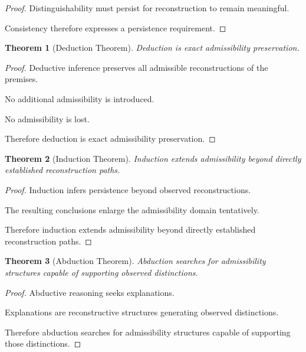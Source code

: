 \documentclass[12pt,oneside]{article}
\newtheorem{theorem}{Theorem}[section] \newtheorem{lemma}[theorem]{Lemma} \newtheorem{proposition}[theorem]{Proposition} \newtheorem{corollary}[theorem]{Corollary}
\theoremstyle{definition}
\begin{document}
\begin{proof}

Distinguishability must persist for reconstruction to remain meaningful.

Consistency therefore expresses a persistence requirement.

\end{proof}

\begin{theorem}[Deduction Theorem]

Deduction is exact admissibility preservation.

\end{theorem}

\begin{proof}

Deductive inference preserves all admissible reconstructions of the premises.

No additional admissibility is introduced.

No admissibility is lost.

Therefore deduction is exact admissibility preservation.

\end{proof}

\begin{theorem}[Induction Theorem]

Induction extends admissibility beyond directly established reconstruction paths.

\end{theorem}

\begin{proof}

Induction infers persistence beyond observed reconstructions.

The resulting conclusions enlarge the admissibility domain tentatively.

Therefore induction extends admissibility beyond directly established reconstruction paths.

\end{proof}

\begin{theorem}[Abduction Theorem]

Abduction searches for admissibility structures capable of supporting observed distinctions.

\end{theorem}

\begin{proof}

Abductive reasoning seeks explanations.

Explanations are reconstructive structures generating observed distinctions.

Therefore abduction searches for admissibility structures capable of supporting those distinctions.

\end{proof}
\end{document}
